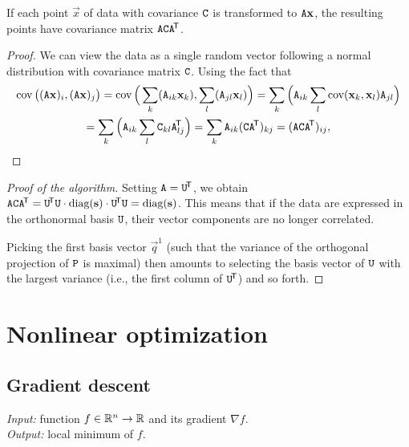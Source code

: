 \begin{lemma}
If each point $\vec x$ of data with covariance $\mathtt{C}$ is transformed to $\mathtt{A} \mathbf{x}$, the resulting points have covariance matrix $\mathtt{A} \mathtt{C} \mathtt{A} ^{\!\mathsf{T}}$.
\end{lemma}

\begin{proof}
We can view the data as a single random vector following a normal distribution with covariance matrix $\mathtt{C}$.
Using the fact that 
\begin{multline}
\operatorname{\textrm{cov}}\big( (\mathtt{A} \mathbf{x})_i, (\mathtt{A} \mathbf{x})_j \big) = \operatorname{\textrm{cov}}\Big( \sum_k(\mathtt{A}_{ik} \mathbf{x}_k), \sum_l(\mathtt{A}_{jl} \mathbf{x}_l) \Big) = \sum_k \Big( \mathtt{A}_{ik} \sum_l \operatorname{\textrm{cov}}( \mathbf{x}_k, \mathbf{x}_l ) \mathtt{A}_{jl} \Big) \\
= \sum_k \Big( \mathtt{A}_{ik} \sum_l \mathtt{C}_{kl} \mathtt{A}_{lj}^{\!\mathsf{T}} \Big) = \sum_k \mathtt{A}_{ik} (\mathtt{C} \mathtt{A} ^{\!\mathsf{T}})_{kj} = (\mathtt{A} \mathtt{C} \mathtt{A}^{\!\mathsf{T}})_{ij},
\end{multline}
\end{proof}

\begin{proof}[Proof of the algorithm]
Setting $\mathtt{A} = \mathtt{U}^{\!\mathsf{T}}$, we obtain $\mathtt{A} \mathtt{C} \mathtt{A} ^{\!\mathsf{T}} = \mathtt{U}^{\!\mathsf{T}} \mathtt{U} \cdot \textrm{diag}(\mathbf{s}) \cdot \mathtt{U}^{\!\mathsf{T}} \mathtt{U} = \textrm{diag}(\mathbf{s})$.
This means that if the data are expressed in the orthonormal basis  $\mathtt{U}$, their vector components are no longer correlated.

Picking the first basis vector $\vec q^1$ (such that the variance of the orthogonal projection of $\mathtt{P}$ is maximal) then amounts to selecting the basis vector of $\mathtt{U}$ with the largest variance (i.e., the first column of $\mathtt{U} ^{\!\mathsf{T}}$) and so forth.

\end{proof}

\section{Nonlinear optimization}

\subsection{Gradient descent}
\textit{Input:} function $f \in \mathbb{R}^n \to \mathbb{R}$ and its gradient $\nabla f$.\\
\textit{Output:} local minimum of $f$.\\


